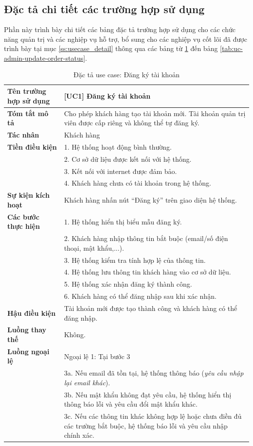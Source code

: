 \vspace{12pt}

\subsection*{Đặc tả chi tiết các trường hợp sử dụng} \label{sec:appx_usecase_detail}
Phần này trình bày chi tiết các bảng đặc tả trường hợp sử dụng cho các chức năng quản trị và các nghiệp vụ hỗ trợ, bổ sung cho các nghiệp vụ cốt lõi đã được trình bày tại mục \ref{ss:usecase_detail} thông qua các bảng từ \ref{tab:uc-register} đến bảng \ref{tab:uc-admin-update-order-status}.

\begin{longtable}{|>{\bfseries}p{4cm}|p{11.5cm}|}
\caption{Đặc tả use case: Đăng ký tài khoản}
\label{tab:uc-register} \\
\hline
\textbf{Tên trường hợp sử dụng} & [UC1] Đăng ký tài khoản \\
\hline
\textbf{Tóm tắt mô tả} & Cho phép khách hàng tạo tài khoản mới. Tài khoản quản trị viên được cấp riêng và không thể tự đăng ký. \\
\hline
\textbf{Tác nhân} & Khách hàng \\
\hline
\textbf{Tiền điều kiện} & 1. Hệ thống hoạt động bình thường. \\
& 2. Cơ sở dữ liệu được kết nối với hệ thống. \\
& 3. Kết nối với internet được đảm bảo. \\
& 4. Khách hàng chưa có tài khoản trong hệ thống. \\
\hline
\textbf{Sự kiện kích hoạt} & Khách hàng nhấn nút “Đăng ký” trên giao diện hệ thống. \\
\hline
\textbf{Các bước thực hiện} & 1. Hệ thống hiển thị biểu mẫu đăng ký. \\
& 2. Khách hàng nhập thông tin bắt buộc (email/số điện thoại, mật khẩu,...). \\
& 3. Hệ thống kiểm tra tính hợp lệ của thông tin. \\
& 4. Hệ thống lưu thông tin khách hàng vào cơ sở dữ liệu. \\
& 5. Hệ thống xác nhận đăng ký thành công. \\
& 6. Khách hàng có thể đăng nhập sau khi xác nhận. \\
\hline
\textbf{Hậu điều kiện} & Tài khoản mới được tạo thành công và khách hàng có thể đăng nhập. \\
\hline
\textbf{Luồng thay thế} & Không. \\
\hline
\textbf{Luồng ngoại lệ} & Ngoại lệ 1: Tại bước 3 \\
& 3a. Nếu email đã tồn tại, hệ thống thông báo (\textit{yêu cầu nhập lại email khác}). \\
& 3b. Nếu mật khẩu không đạt yêu cầu, hệ thống hiển thị thông báo lỗi và yêu cầu đổi mật khẩu khác. \\
& 3c. Nếu các thông tin khác không hợp lệ hoặc chưa điền đủ các trường bắt buộc, hệ thống báo lỗi và yêu cầu nhập chính xác. \\
\hline
\end{longtable}


